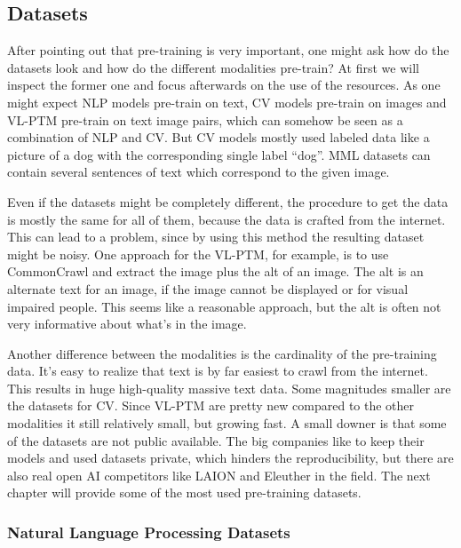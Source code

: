 \documentclass[
]{krantz}
\begin{document}
\hypertarget{datasets}{%
\subsection{Datasets}\label{datasets}}

After pointing out that pre-training is very important, one might ask how do the datasets look and how do the different modalities pre-train? At first we will inspect the former one and focus afterwards on the use of the resources. As one might expect NLP models pre-train on text, CV models pre-train on images and VL-PTM pre-train on text image pairs, which can somehow be seen as a combination of NLP and CV. But CV models mostly used labeled data like a picture of a dog with the corresponding single label ``dog''. MML datasets can contain several sentences of text which correspond to the given image.

Even if the datasets might be completely different, the procedure to get the data is mostly the same for all of them, because the data is crafted from the internet. This can lead to a problem, since by using this method the resulting dataset might be noisy. One approach for the VL-PTM, for example, is to use CommonCrawl and extract the image plus the alt of an image. The alt is an alternate text for an image, if the image cannot be displayed or for visual impaired people. This seems like a reasonable approach, but the alt is often not very informative about what's in the image.

Another difference between the modalities is the cardinality of the pre-training data. It's easy to realize that text is by far easiest to crawl from the internet. This results in huge high-quality massive text data. Some magnitudes smaller are the datasets for CV. Since VL-PTM are pretty new compared to the other modalities it still relatively small, but growing fast. A small downer is that some of the datasets are not public available. The big companies like to keep their models and used datasets private, which hinders the reproducibility, but there are also real open AI competitors like LAION and Eleuther in the field. The next chapter will provide some of the most used pre-training datasets.

\hypertarget{natural-language-processing-datasets}{%
\subsubsection{Natural Language Processing Datasets}\label{natural-language-processing-datasets}}
\end{document}

